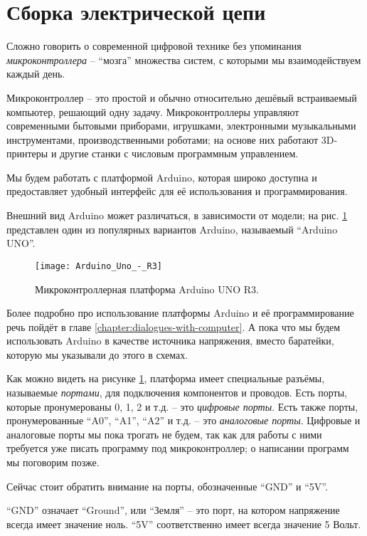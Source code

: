 \documentclass[../sparc.tex]{subfiles}
\begin{document}
\section{Сборка электрической цепи}

Сложно говорить о современной цифровой технике без упоминания
\emph{микроконтроллера} -- ``мозга'' множества систем, с которыми мы
взаимодействуем каждый день.

Микроконтроллер -- это простой и обычно относительно дешёвый встраиваемый
компьютер, решающий одну задачу.  Микроконтроллеры управляют современными
бытовыми приборами, игрушками, электронными музыкальными инструментами,
производственными роботами; на основе них работают 3D-принтеры и другие станки с
числовым программным управлением.

Мы будем работать с платформой Arduino, которая широко доступна и предоставляет
удобный интерфейс для её использования и программирования.

Внешний вид Arduino может различаться, в зависимости от модели; на
рис. \ref{fig:arduino-uno-r3} представлен один из популярных вариантов Arduino,
называемый ``Arduino UNO''.

\begin{figure}[ht]
  \centering
  \texttt{[image: Arduino\_Uno\_-\_R3]}
  \caption{Микроконтроллерная платформа Arduino UNO R3.}
  \label{fig:arduino-uno-r3}
\end{figure}

Более подробно про использование платформы Arduino и её программирование речь
пойдёт в главе \ref{chapter:dialogues-with-computer}.  А пока что мы будем
использовать Arduino в качестве источника напряжения, вместо баратейки, которую
мы указывали до этого в схемах.

Как можно видеть на рисунке \ref{fig:arduino-uno-r3}, платформа имеет
специальные разъёмы, называемые \emph{портами}, для подключения компонентов и
проводов.  Есть порты, которые пронумерованы 0, 1, 2 и т.д. -- это \emph{цифровые
порты}.  Есть также порты, пронумерованные ``A0'', ``A1'', ``A2'' и т.д. -- это
\emph{аналоговые порты}.  Цифровые и аналоговые порты мы пока трогать не будем,
так как для работы с ними требуется уже писать программу под микроконтроллер; о
написании программ мы поговорим позже.

Сейчас стоит обратить внимание на порты, обозначенные ``GND'' и ``5V''.

``GND'' означает ``Ground'', или ``Земля'' -- это порт, на котором напряжение
всегда имеет значение ноль. ``5V'' соответственно имеет всегда значение 5 Вольт.
\end{document}
